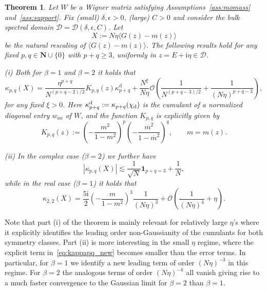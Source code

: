 \documentclass[10pt]{amsart}
\newtheorem{theorem}{Theorem}[section]
\numberwithin{equation}{section}
\newcommand{\dif}{\mathrm{d}}
\newcommand{\N}{\mathbf{N}}
\newcommand{\ii}{\mathrm{i}}
\begin{document}
\begin{theorem}\label{theo:main} Let $W$ be a Wigner matrix satisfying Assumptions~\ref{ass:momass} and~\ref{ass:support}. Fix (small) $\delta, \epsilon>0$, (large) $C>0$ and consider the bulk spectral domain
$\mathcal{D}=\mathcal{D}(\delta,\epsilon,C)$. Let
\begin{equation*}
X:= N\eta\langle G(z)-m(z)\rangle
\end{equation*}
be the natural rescaling of $\langle G(z)-m(z)\rangle$. The following results hold for any fixed $p,q\in \N\cup\{0\}$ with $p+q\ge 3$, uniformly in $z=E+\ii\eta\in\mathcal{D}$.

\emph{(i)} Both for $\beta=1$ and $\beta=2$ it holds that
\begin{equation}
\kappa_{p,q}\left(X\right) = \frac{\eta^{p+q}}{N^{(p+q-2)/2}}K_{p,q}(z)\kappa_{p+q}^{\mathrm{d}} + \frac{N^\xi}{N\eta} \mathcal{O}\left( \frac{1}{N^{(p+q-3)/2}}+ \frac{1}{(N\eta)^{p+q-3}}\right),
\label{eq:kappapq_new}
\end{equation}
for any fixed $\xi>0$. Here $\kappa^{\dif}_{p+q}:=\kappa_{p+q}(\chi_{\rm{d}})$ is the cumulant of a normalized diagonal entry $w_{aa}$ of $W$, and the function $K_{p,q}$ is explicitly given by
\begin{equation}
K_{p,q}(z) := \left( - \frac{m^2}{1-m^2}\right)^p \left(  - \frac{\overline{m}^2}{1-\overline{m}^2}\right)^q, 
\qquad m= m(z).
\label{eq:def_K}
\end{equation}

\emph{(ii)} In the complex case ($\beta=2$) we further have
\begin{equation}
\left\vert\kappa_{p,q}\left(X\right)\right\vert \lesssim \frac{1}{\sqrt{N}}\bm{1}_{p+q=3} + \frac{1}{N},
\label{eq:main_pq}
\end{equation} 
while in the real case ($\beta=1$) it holds that
\begin{equation}
\kappa_{2,2}\left(X\right) = \frac{5\ii}{2} \left(-\frac{m}{1-m^2}\right)^3 \frac{1}{(N\eta)^3} + \mathcal{O}\left(\frac{1}{(N\eta)^4}+\eta\right).
\label{eq:kappa22_real}
\end{equation}
\end{theorem}

Note that part (i) of the theorem is mainly relevant for relatively large $\eta$’s where it explicitly identifies the leading order non-Gaussianity of the cumulants for both symmetry classes. Part (ii) is more interesting in the small $\eta$ regime, where the explicit term in~\eqref{eq:kappapq_new} becomes smaller than the error terms. In particular, for $\beta=1$ we identify a new leading term of order $(N\eta)^{-3}$ in this regime. For $\beta=2$ the analogous terms of order $(N\eta)^{-k}$ all vanish giving rise to a much faster convergence to the Gaussian limit for $\beta=2$ than $\beta=1$.
\end{document}
